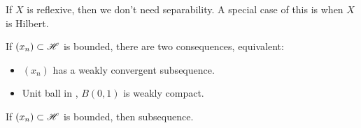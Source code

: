 \begin{remark}\nl
    If $X$ is reflexive, then we don't need separability. A special case of this is when $X$ is Hilbert.
\end{remark}

\begin{corollary}\nl
    If $(x_n)\subset \mathscr{H}$ is bounded, there are two consequences, equivalent:
    \begin{itemize}
        \item $(x_n)$ has a weakly convergent subsequence.
        \item Unit ball in \hbs, $B(0,1)$ is weakly compact.
    \end{itemize}
    If $(x_n)\subset \mathscr{H}$ is bounded, then  subsequence. 
\end{corollary}